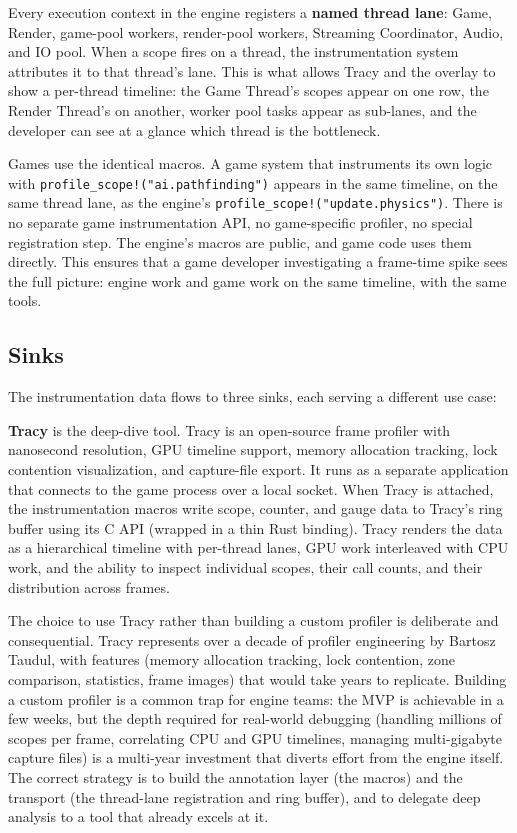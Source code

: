 \documentclass[
  11pt,
  letterpaper,
  DIV=11,
  numbers=noendperiod,
  twoside,
  open=right]{scrreprt}
\begin{document}
Every execution context in the engine registers a \textbf{named thread
lane}: Game, Render, game-pool workers, render-pool workers, Streaming
Coordinator, Audio, and IO pool. When a scope fires on a thread, the
instrumentation system attributes it to that thread's lane. This is what
allows Tracy and the overlay to show a per-thread timeline: the Game
Thread's scopes appear on one row, the Render Thread's on another,
worker pool tasks appear as sub-lanes, and the developer can see at a
glance which thread is the bottleneck.

Games use the identical macros. A game system that instruments its own
logic with \texttt{profile\_scope!("ai.pathfinding")} appears in the
same timeline, on the same thread lane, as the engine's
\texttt{profile\_scope!("update.physics")}. There is no separate game
instrumentation API, no game-specific profiler, no special registration
step. The engine's macros are public, and game code uses them directly.
This ensures that a game developer investigating a frame-time spike sees
the full picture: engine work and game work on the same timeline, with
the same tools.

\subsection{Sinks}\label{sinks}

The instrumentation data flows to three sinks, each serving a different
use case:

\textbf{Tracy} is the deep-dive tool. Tracy is an open-source frame
profiler with nanosecond resolution, GPU timeline support, memory
allocation tracking, lock contention visualization, and capture-file
export. It runs as a separate application that connects to the game
process over a local socket. When Tracy is attached, the instrumentation
macros write scope, counter, and gauge data to Tracy's ring buffer using
its C API (wrapped in a thin Rust binding). Tracy renders the data as a
hierarchical timeline with per-thread lanes, GPU work interleaved with
CPU work, and the ability to inspect individual scopes, their call
counts, and their distribution across frames.

The choice to use Tracy rather than building a custom profiler is
deliberate and consequential. Tracy represents over a decade of profiler
engineering by Bartosz Taudul, with features (memory allocation
tracking, lock contention, zone comparison, statistics, frame images)
that would take years to replicate. Building a custom profiler is a
common trap for engine teams: the MVP is achievable in a few weeks, but
the depth required for real-world debugging (handling millions of scopes
per frame, correlating CPU and GPU timelines, managing multi-gigabyte
capture files) is a multi-year investment that diverts effort from the
engine itself. The correct strategy is to build the annotation layer
(the macros) and the transport (the thread-lane registration and ring
buffer), and to delegate deep analysis to a tool that already excels at
it.
\end{document}
